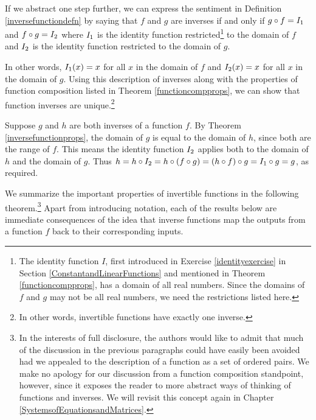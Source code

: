 \smallskip

If we abstract one step further, we can express the sentiment in Definition \ref{inversefunctiondefn} by saying that $f$ and $g$ are inverses if and only if  $g \circ f = I_{\text{\scriptsize $1$}}$ and $f \circ g = I_{\text{\scriptsize $2$}}$ where $I_{\text{\scriptsize $1$}}$ is the identity function restricted\footnote{The identity function $I$, first introduced in Exercise \ref{identityexercise} in Section \ref{ConstantandLinearFunctions} and mentioned in Theorem \ref{functioncompprops}, has a domain of all real numbers.  Since the domains of $f$ and $g$ may not be all real numbers, we need the restrictions listed here.} to the domain of $f$ and $I_{\text{\scriptsize $2$}}$ is the identity function restricted to the domain of $g$.  

\smallskip

In other words, $I_{\text{\scriptsize $1$}}(x) = x$ for all $x$ in the domain of $f$ and $I_{\text{\scriptsize $2$}}(x) = x$ for all $x$ in the domain of $g$.    Using this description of inverses along with the properties of function composition listed in Theorem  \ref{functioncompprops}, we can show that function inverses are unique.\footnote{In other words, invertible functions have exactly one inverse.}   

\smallskip

Suppose $g$ and $h$ are both inverses of a function $f$. By Theorem \ref{inversefunctionprops}, the domain of $g$ is equal to the domain of $h$, since both are the range of $f$.  This means the identity function $I_{\text{\scriptsize $2$}}$ applies both to the domain of $h$ and the domain of $g$.  Thus $h = h \circ I_{\text{\scriptsize $2$}} = h \circ (f \circ g) = (h \circ f) \circ g = I_{\text{\scriptsize $1$}} \circ g = g$, as required.

\smallskip

We summarize the important properties of invertible functions in the following theorem.\footnote{In the interests of full disclosure, the authors would like to admit that much of the discussion in the previous paragraphs could have easily been avoided had we appealed to the description of a function as a set of ordered pairs.  We make no apology for our discussion from a function composition standpoint, however, since it exposes the reader to more abstract ways of thinking of functions and inverses.  We will revisit this concept again in Chapter \ref{SystemsofEquationsandMatrices}.}  Apart from introducing notation, each of the results below are immediate consequences of the idea that inverse functions map the outputs from a function $f$  back to their corresponding inputs.


